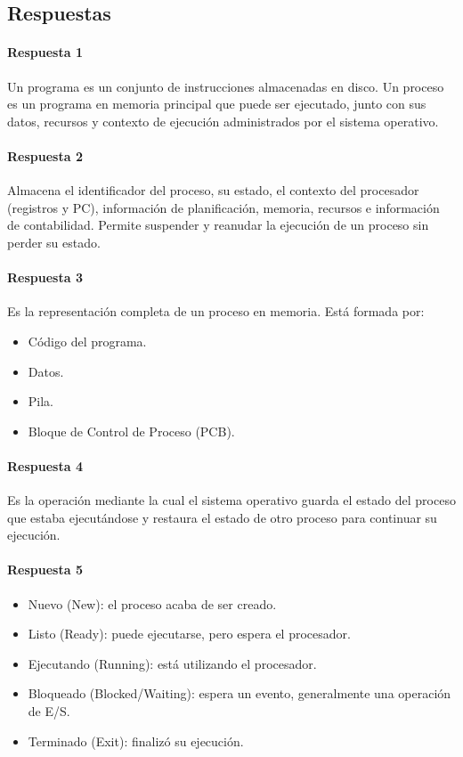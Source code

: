 \subsection*{Respuestas}

\paragraph{Respuesta 1} 
Un programa es un conjunto de instrucciones almacenadas en disco. Un proceso es un programa en memoria principal que puede ser ejecutado, junto con sus datos, recursos y contexto de ejecución administrados por el sistema operativo.

\paragraph{Respuesta 2}
Almacena el identificador del proceso, su estado, el contexto del procesador (registros y PC), información de planificación, memoria, recursos e información de contabilidad. Permite suspender y reanudar la ejecución de un proceso sin perder su estado.

\paragraph{Respuesta 3}
Es la representación completa de un proceso en memoria. Está formada por:
\begin{itemize}
  \item Código del programa.
  \item Datos.
  \item Pila.
  \item Bloque de Control de Proceso (PCB).
\end{itemize}

\paragraph{Respuesta 4}
Es la operación mediante la cual el sistema operativo guarda el estado del proceso que estaba ejecutándose y restaura el estado de otro proceso para continuar su ejecución.

\paragraph{Respuesta 5}
\begin{itemize}
  \item Nuevo (New): el proceso acaba de ser creado.
  \item Listo (Ready): puede ejecutarse, pero espera el procesador.
  \item Ejecutando (Running): está utilizando el procesador.
  \item Bloqueado (Blocked/Waiting): espera un evento, generalmente una operación de E/S.
  \item Terminado (Exit): finalizó su ejecución.
\end{itemize}

